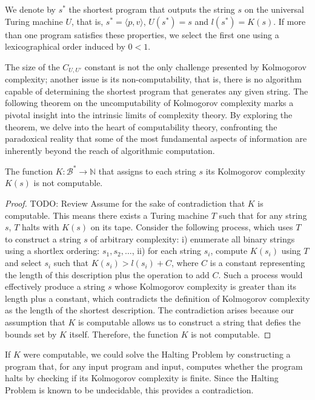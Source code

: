 \begin{notation}
We denote by \(s^\ast\) the shortest program that outputs the string \(s\) on the universal Turing machine \(U\), that is, \(s^\ast = \langle p,v \rangle\), \(U(s^\ast) = s\) and \(l(s^\ast) = K(s)\). If more than one program satisfies these properties, we select the first one using a lexicographical order induced by \(0 < 1\).
\end{notation}

The size of the \(C_{U, U'}\) constant is not the only challenge presented by Kolmogorov complexity; another issue is its non-computability, that is, there is no algorithm capable of determining the shortest program that generates any given string. The following theorem on the uncomputability of Kolmogorov complexity marks a pivotal insight into the intrinsic limits of complexity theory. By exploring the theorem, we delve into the heart of computability theory, confronting the paradoxical reality that some of the most fundamental aspects of information are inherently beyond the reach of algorithmic computation.

\begin{theorem}
The function \(K: \mathcal{B}^\ast \rightarrow \mathbb{N}\) that assigns to each string \(s\) its Kolmogorov complexity \(K(s)\) is not computable.
\end{theorem}
\begin{proof}
{\color{red} TODO: Review}
Assume for the sake of contradiction that \(K\) is computable. This means there exists a Turing machine \(T\) such that for any string \(s\), \(T\) halts with \(K(s)\) on its tape. Consider the following process, which uses \(T\) to construct a string \(s\) of arbitrary complexity: i) enumerate all binary strings using a shortlex ordering: \(s_1, s_2, \ldots\), ii) for each string \(s_i\), compute \(K(s_i)\) using \(T\) and select \(s_i\) such that \(K(s_i) > l(s_i) + C\), where \(C\) is a constant representing the length of this description plus the operation to add \(C\). Such a process would effectively produce a string \(s\) whose Kolmogorov complexity is greater than its length plus a constant, which contradicts the definition of Kolmogorov complexity as the length of the shortest description. The contradiction arises because our assumption that \(K\) is computable allows us to construct a string that defies the bounds set by \(K\) itself. Therefore, the function \(K\) is not computable.
\end{proof}

If \(K\) were computable, we could solve the Halting Problem by constructing a program that, for any input program and input, computes whether the program halts by checking if its Kolmogorov complexity is finite. Since the Halting Problem is known to be undecidable, this provides a contradiction.


